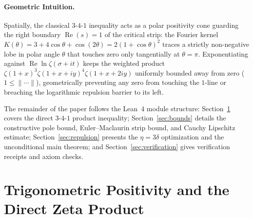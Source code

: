 \documentclass[11pt,a4paper]{article}
\theoremstyle{definition}
\begin{document}
\paragraph{Geometric Intuition.}
Spatially, the classical $3$-$4$-$1$ inequality acts as a polar positivity cone guarding the right boundary $\operatorname{Re}(s) = 1$ of the critical strip: the Fourier kernel $K(\theta) = 3 + 4\cos\theta + \cos(2\theta) = 2(1+\cos\theta)^2$ traces a strictly non-negative lobe in polar angle $\theta$ that touches zero only tangentially at $\theta = \pi$. Exponentiating against $\operatorname{Re}\ln\zeta(\sigma + it)$ keeps the weighted product $\zeta(1+x)^3 \zeta(1+x+iy)^4 \zeta(1+x+2iy)$ uniformly bounded away from zero ($1 \le \|\cdots\|$), geometrically preventing any zero from touching the $1$-line or breaching the logarithmic repulsion barrier to its left.

The remainder of the paper follows the Lean~4 module structure: Section~\ref{sec:trig} covers the direct $3$-$4$-$1$ product inequality; Section~\ref{sec:bounds} details the constructive pole bound, Euler--Maclaurin strip bound, and Cauchy Lipschitz estimate; Section~\ref{sec:repulsion} presents the $\eta = 3\delta$ optimization and the unconditional main theorem; and Section~\ref{sec:verification} gives verification receipts and axiom checks.

\section{Trigonometric Positivity and the Direct Zeta Product}\label{sec:trig}
\end{document}
